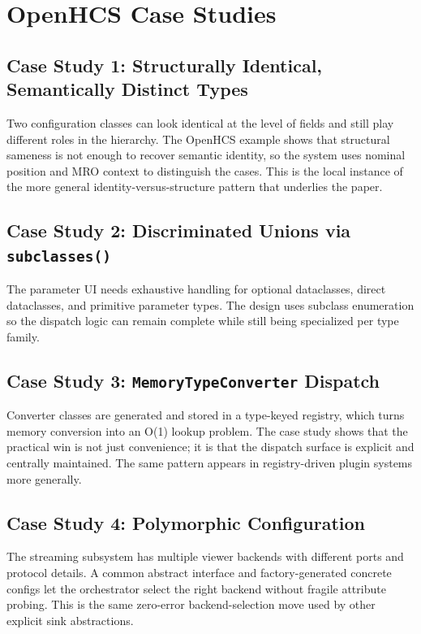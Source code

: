 \section{OpenHCS Case Studies}

\subsection{Case Study 1: Structurally Identical, Semantically Distinct Types}
Two configuration classes can look identical at the level of fields and still play different roles in the hierarchy. The OpenHCS example shows that structural sameness is not enough to recover semantic identity, so the system uses nominal position and MRO context to distinguish the cases. This is the local instance of the more general identity-versus-structure pattern that underlies the paper.

\subsection{Case Study 2: Discriminated Unions via \texttt{subclasses()}}
The parameter UI needs exhaustive handling for optional dataclasses, direct dataclasses, and primitive parameter types. The design uses subclass enumeration so the dispatch logic can remain complete while still being specialized per type family.

\subsection{Case Study 3: \texttt{MemoryTypeConverter} Dispatch}
Converter classes are generated and stored in a type-keyed registry, which turns memory conversion into an O(1) lookup problem. The case study shows that the practical win is not just convenience; it is that the dispatch surface is explicit and centrally maintained. The same pattern appears in registry-driven plugin systems more generally.

\subsection{Case Study 4: Polymorphic Configuration}
The streaming subsystem has multiple viewer backends with different ports and protocol details. A common abstract interface and factory-generated concrete configs let the orchestrator select the right backend without fragile attribute probing. This is the same zero-error backend-selection move used by other explicit sink abstractions.

